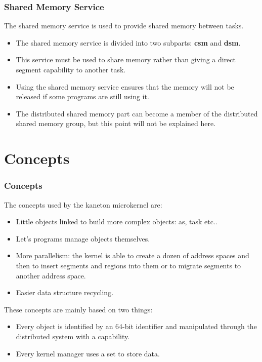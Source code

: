 
\begin{frame}
  \frametitle{Shared Memory Service}

  The shared memory service is used to provide shared memory between tasks.

  \nl

  \begin{itemize}[<+->]
    \item
      The shared memory service is divided into two subparts:
      \textbf{csm} and \textbf{dsm}.
    \item
      This service must be used to share memory rather than giving a
      direct segment capability to another task.
    \item
      Using the shared memory service ensures that the memory will not
      be released if some programs are still using it.
    \item
      The distributed shared memory part can become a member of the
      distributed shared memory group, but this point will not be
      explained here.
  \end{itemize}
\end{frame}

%
%

\section{Concepts}


\begin{frame}
  \frametitle{Concepts}

  The concepts used by the kaneton microkernel are:

  \begin{itemize}[<+->]
    \item
      Little objects linked to build more complex objects:
      as, task etc..
    \item
      Let's programs manage objects themselves.
    \item
      More parallelism: the kernel is able to create a dozen
      of address spaces and then to insert segments and regions
      into them or to migrate segments to another address space.
    \item
      Easier data structure recycling.
  \end{itemize}

  These concepts are mainly based on two things:

  \begin{itemize}[<+->]
    \item
      Every object is identified by an 64-bit identifier and manipulated
      through the distributed system with a capability.
    \item
      Every kernel manager uses a set to store data.
  \end{itemize}
\end{frame}

